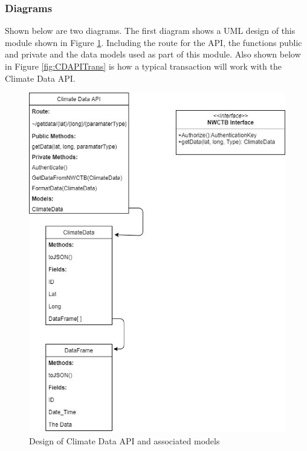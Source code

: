 \documentclass[onecolumn, draftclsnofoot,10pt, compsoc]{article}
\begin{document}
			\subsubsection{Diagrams}
				Shown below are two diagrams. The first diagram shows a UML design of this module shown in Figure \ref{fig:CDAPI}. Including the route for the API, the functions public and private and the data models used as part of this module. Also shown below in Figure \ref{fig:CDAPITrans} is how a typical transaction will work with the Climate Data API.\\
		\clearpage
		\begin{figure}[htb]
			\begin{center}
				\includegraphics[width=375pt]{UMLDiagrams/ClimateAPI.eps}
			\end{center}
			\caption{Design of Climate Data API and associated models}
			\label{fig:CDAPI}
		\end{figure}
		\clearpage
\end{document}
